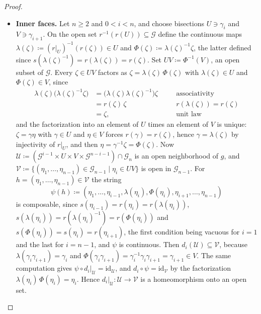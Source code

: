\documentclass{extracta-temp-26}
\numberwithin{equation}{section}
\theoremstyle{definition}
\theoremstyle{remark}
\newcommand{\G}{\mathcal{G}}
\newcommand{\id}{\mathrm{id}}
\newcommand{\restr}[2]{#1\rvert_{#2}}
\newcommand{\step}[1]{\textbf{#1}}
\begin{document}
\begin{proof}
\begin{itemize}
Moreover \(d_0\circ\psi=\id_{\mathcal V}\), and \(\psi\circ\restr{d_0}{\mathcal U}=\id_{\mathcal U}\) since \(\restr{s}{U}\) is injective and \(\gamma_1\in U\).
Hence \(\restr{d_0}{\mathcal U}\colon\mathcal U\to\mathcal V\) is a homeomorphism onto an open set, so \(d_0\) is a local homeomorphism.
The face \(d_n\) is treated symmetrically, with a bisection \(U'\ni\gamma_n\) and the entry \((\restr{r}{U'})^{-1}(s(\eta_{n-1}))\) appended.
\item \step{Inner faces.}
Let \(n\ge 2\) and \(0<i<n\), and choose bisections \(U\ni\gamma_i\) and \(V\ni\gamma_{i+1}\).
On the open set \(r^{-1}(r(U))\subseteq\G\) define the continuous maps \(\lambda(\zeta)\coloneqq(\restr{r}{U})^{-1}(r(\zeta))\in U\) and \(\Phi(\zeta)\coloneqq\lambda(\zeta)^{-1}\zeta\), the latter defined since \(s(\lambda(\zeta)^{-1})=r(\lambda(\zeta))=r(\zeta)\).
Set \(UV\coloneqq\Phi^{-1}(V)\), an open subset of \(\G\).
Every \(\zeta\in UV\) factors as \(\zeta=\lambda(\zeta)\,\Phi(\zeta)\) with \(\lambda(\zeta)\in U\) and \(\Phi(\zeta)\in V\), since
\begin{equation}\label{eq:inner-factor}
\begin{aligned}
\lambda(\zeta)\bigl(\lambda(\zeta)^{-1}\zeta\bigr)
&=\bigl(\lambda(\zeta)\lambda(\zeta)^{-1}\bigr)\zeta&&\quad\text{associativity}\\
&=r(\zeta)\,\zeta&&\quad\text{\(r(\lambda(\zeta))=r(\zeta)\)}\\
&=\zeta,&&\quad\text{unit law}
\end{aligned}
\end{equation}
and the factorization into an element of \(U\) times an element of \(V\) is unique: \(\zeta=\gamma\eta\) with \(\gamma\in U\) and \(\eta\in V\) forces \(r(\gamma)=r(\zeta)\), hence \(\gamma=\lambda(\zeta)\) by injectivity of \(\restr{r}{U}\), and then \(\eta=\gamma^{-1}\zeta=\Phi(\zeta)\).
Now \(\mathcal U\coloneqq(\G^{i-1}\times U\times V\times\G^{n-i-1})\cap\G_n\) is an open neighborhood of \(g\), and \(\mathcal V\coloneqq\{(\eta_1,\dots,\eta_{n-1})\in\G_{n-1}\mid\eta_i\in UV\}\) is open in \(\G_{n-1}\).
For \(h=(\eta_1,\dots,\eta_{n-1})\in\mathcal V\) the string
\begin{equation}\label{eq:inner-psi}
\psi(h)\coloneqq(\eta_1,\dots,\eta_{i-1},\lambda(\eta_i),\Phi(\eta_i),\eta_{i+1},\dots,\eta_{n-1})
\end{equation}
is composable, since \(s(\eta_{i-1})=r(\eta_i)=r(\lambda(\eta_i))\), \(s(\lambda(\eta_i))=r(\lambda(\eta_i)^{-1})=r(\Phi(\eta_i))\) and \(s(\Phi(\eta_i))=s(\eta_i)=r(\eta_{i+1})\), the first condition being vacuous for \(i=1\) and the last for \(i=n-1\), and \(\psi\) is continuous.
Then \(d_i(\mathcal U)\subseteq\mathcal V\), because \(\lambda(\gamma_i\gamma_{i+1})=\gamma_i\) and \(\Phi(\gamma_i\gamma_{i+1})=\gamma_i^{-1}\gamma_i\gamma_{i+1}=\gamma_{i+1}\in V\).
The same computation gives \(\psi\circ\restr{d_i}{\mathcal U}=\id_{\mathcal U}\), and \(d_i\circ\psi=\id_{\mathcal V}\) by the factorization \(\lambda(\eta_i)\,\Phi(\eta_i)=\eta_i\).
Hence \(\restr{d_i}{\mathcal U}\colon\mathcal U\to\mathcal V\) is a homeomorphism onto an open set.\qedhere
\end{itemize}
\end{proof}
\end{document}
